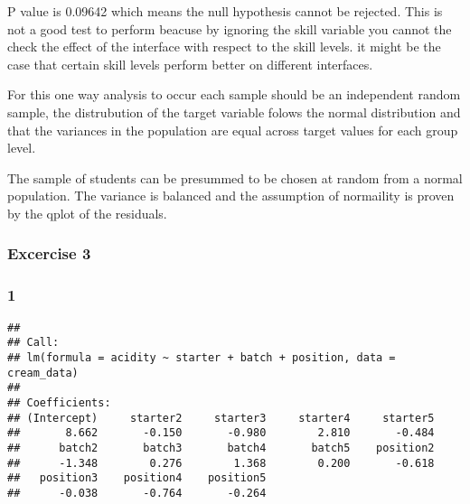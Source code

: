\documentclass[11pt,]{article}
\newenvironment{Shaded}{\begin{snugshade}}{\end{snugshade}}
\newcommand{\KeywordTok}[1]{\textcolor[rgb]{0.13,0.29,0.53}{\textbf{{#1}}}}
\newcommand{\DataTypeTok}[1]{\textcolor[rgb]{0.13,0.29,0.53}{{#1}}}
\newcommand{\CharTok}[1]{\textcolor[rgb]{0.31,0.60,0.02}{{#1}}}
\newcommand{\StringTok}[1]{\textcolor[rgb]{0.31,0.60,0.02}{{#1}}}
\newcommand{\OtherTok}[1]{\textcolor[rgb]{0.56,0.35,0.01}{{#1}}}
\newcommand{\NormalTok}[1]{{#1}}
\begin{document}
P value is 0.09642 which means the null hypothesis cannot be rejected.
This is not a good test to perform beacuse by ignoring the skill
variable you cannot the check the effect of the interface with respect
to the skill levels. it might be the case that certain skill levels
perform better on different interfaces.

For this one way analysis to occur each sample should be an independent
random sample, the distrubution of the target variable folows the normal
distribution and that the variances in the population are equal across
target values for each group level.

The sample of students can be presummed to be chosen at random from a
normal population. The variance is balanced and the assumption of
normaility is proven by the qplot of the residuals.

\subsubsection{Excercise 3}\label{excercise-3}

\subsubsection{1}\label{section-12}

\begin{Shaded}
\end{Shaded}

\begin{verbatim}
## 
## Call:
## lm(formula = acidity ~ starter + batch + position, data = cream_data)
## 
## Coefficients:
## (Intercept)     starter2     starter3     starter4     starter5  
##       8.662       -0.150       -0.980        2.810       -0.484  
##      batch2       batch3       batch4       batch5    position2  
##      -1.348        0.276        1.368        0.200       -0.618  
##   position3    position4    position5  
##      -0.038       -0.764       -0.264
\end{verbatim}
\end{document}

